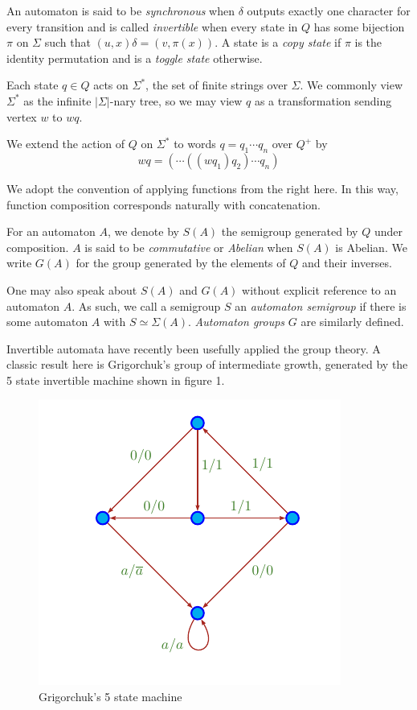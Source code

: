 \documentclass[10pt]{article}
\newcommand{\defn}[1]{\textit{#1}}
\begin{document}
An automaton is said to be \defn{synchronous} when $\delta$ outputs
exactly one character for every transition and is called
\defn{invertible} when every state in $Q$ has some bijection $\pi$ on
$\Sigma$ such that $(u, x)\delta = (v, \pi(x))$. A state is a
\defn{copy state} if $\pi$ is the identity permutation and is a
\defn{toggle state} otherwise.

Each state $q \in Q$ acts on $\Sigma^*$, the set of finite strings
over $\Sigma$. We commonly view $\Sigma^*$ as the infinite
$|\Sigma|$-nary tree, so we may view $q$ as a transformation sending
vertex $w$ to $wq$.

We extend the action of $Q$ on $\Sigma^*$ to words $q = q_1\cdots q_n$
over $Q^+$ by \[ wq = (\cdots((w q_1) q_2)\cdots q_n) \]

We adopt the convention of applying functions from the right here. In
this way, function composition corresponds naturally with
concatenation.

For an automaton $A$, we denote by $S(A)$ the semigroup generated by
$Q$ under composition. $A$ is said to be \defn{commutative} or
\defn{Abelian} when $S(A)$ is Abelian. We write $G(A)$ for the group
generated by the elements of $Q$ and their inverses.

One may also speak about $S(A)$ and $G(A)$ without explicit reference
to an automaton $A$. As such, we call a semigroup $S$ an
\defn{automaton semigroup} if there is some automaton $A$ with
$S \simeq \Sigma(A)$. \defn{Automaton groups} $G$ are similarly
defined.

Invertible automata have recently been usefully applied the group
theory. A classic result here is Grigorchuk's group of intermediate
growth, generated by the 5 state invertible machine shown in figure 1.

\begin{figure}
\begin{center}
\includegraphics[scale=0.5]{figures/grigorchuk}
\end{center}
\caption{Grigorchuk's 5 state machine}
\end{figure}
\end{document}
